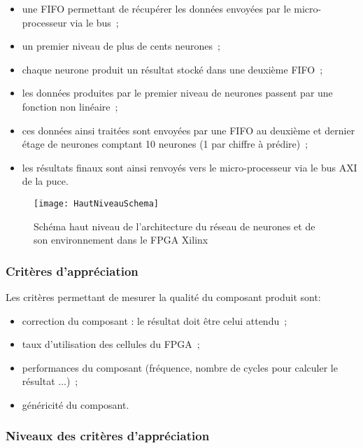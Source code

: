 \begin{itemize}
	\item une FIFO permettant de récupérer les données envoyées par le micro-processeur via le bus~;
	\item un premier niveau de plus de cents neurones~;
	\item chaque neurone produit un résultat stocké dans une deuxième FIFO~;
	\item les données produites par le premier niveau de neurones passent par une fonction non linéaire~;
	\item ces données ainsi traitées sont envoyées par une FIFO au deuxième et dernier étage de neurones comptant 10 neurones (1 par chiffre à prédire)~;
	\item les résultats finaux sont ainsi renvoyés vers le micro-processeur via le bus AXI de la puce.
\end{itemize}

\begin{figure}[htbp]
\begin{center}
\texttt{[image: HautNiveauSchema]}
\caption{Schéma haut niveau de l'architecture du réseau de neurones et de son environnement dans le FPGA Xilinx}
\label{fig:HautNiveauSchema}
\end{center}
\end{figure}

\subsubsection{Critères d’appréciation}

Les critères permettant de mesurer la qualité du composant produit sont:
\begin{itemize}
	\item correction du composant : le résultat doit être celui attendu~;
	\item taux d'utilisation des cellules du FPGA~;
	\item performances du composant (fréquence, nombre de cycles pour
		calculer le résultat ...)~;
	\item généricité du composant.
\end{itemize}

\subsubsection{Niveaux des critères d’appréciation}

